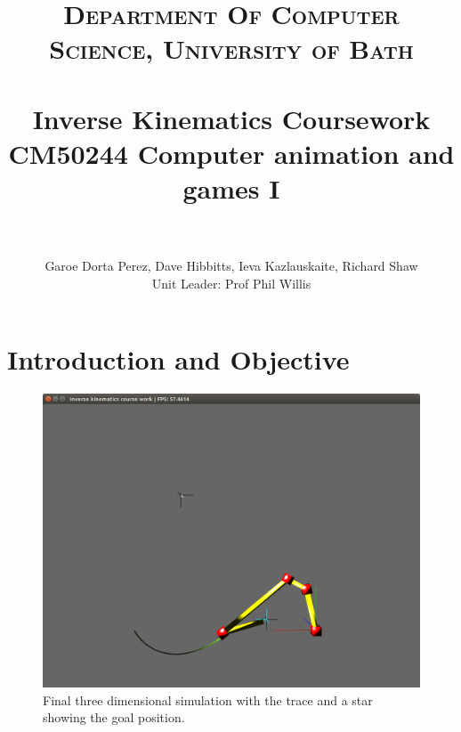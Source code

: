 \documentclass[paper=a4, fontsize=11pt]{scrartcl} %
\title{	
\normalfont \normalsize 
\textsc{Department Of Computer Science, University of Bath} \\ [5pt] %
\horrule{0.7pt} \\[0.2cm] %
\Huge Inverse Kinematics Coursework \\ %
\vspace{7 mm}
\Large CM50244 \: Computer animation and games I \\
\horrule{0.7pt} \\[0.0cm] %
}
\author{Garoe Dorta Perez, Dave Hibbitts, Ieva Kazlauskaite, Richard Shaw \\ \Large Unit Leader: Prof Phil Willis \\}  %
\numberwithin{equation}{section} %
\numberwithin{figure}{section} %
\numberwithin{table}{section} %
\begin{document}
\vspace*{\fill}
\begin{center}
\begin{minipage}{1.0\textwidth}

\clearpage\maketitle %
\thispagestyle{empty}

\end{minipage}
\end{center}
\vfill
\clearpage
\setcounter{page}{1}

\section{Introduction and Objective}

\begin{center}
\begin{figure}
\includegraphics[scale=0.4]{chain3Dexample}
\caption{Final three dimensional simulation with the trace and a star showing the goal position.}
\end{figure}
\end{center}
 
\end{document}

